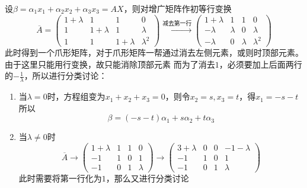 \begin{solution}
    设$\beta = \alpha_1 x_1 + \alpha_2 x_2 + \alpha_3 x_3 = AX$，则对增广矩阵作初等行变换
    \[
        \overline{A}=
        \left(\begin{array}{ccc|c}
                1+\lambda & 1         & 1         & 0         \\
                1         & 1+\lambda & 1         & \lambda   \\
                1         & 1         & 1+\lambda & \lambda^2
            \end{array}\right)
        \xrightarrow{\text{减去第一行}}
        \left(\begin{array}{ccc|c}
                1+\lambda & 1       & 1       & 0         \\
                -\lambda  & \lambda & 0       & \lambda   \\
                -\lambda  & 0       & \lambda & \lambda^2
            \end{array}\right)
    \]
    此时得到一个爪形矩阵，对于爪形矩阵一帮通过消去左侧元素，或则时顶部元素。由于这里只能用行变换，故只能消除顶部元素
    而为了消去$1$，必须要加上后面两行的$-\frac{1}{\lambda}$，所以进行分类讨论：
    \begin{enumerate}[(1)]
        \item 当$\lambda=0$时，方程组变为$x_1+x_2+x_3 = 0$，则令$x_2 = s,x_3=t$，得$x_1 = -s-t$所以
              \[ \beta = (-s-t)\alpha_1 + s\alpha_2 + t\alpha_3 \]
        \item 当$\lambda\neq 0 $时
              \[
                  \overline{A}
                  \longrightarrow
                  \left(\begin{array}{ccc|c}
                          1+\lambda & 1 & 1 & 0       \\
                          -1        & 1 & 0 & 1       \\
                          -1        & 0 & 1 & \lambda
                      \end{array}\right)
                  \longrightarrow
                  \left(\begin{array}{ccc|c}
                          3+\lambda & 0 & 0 & -1-\lambda \\
                          -1        & 1 & 0 & 1          \\
                          -1        & 0 & 1 & \lambda
                      \end{array}\right)
              \]
              此时需要将第一行化为$1$，那么又进行分类讨论

\end{enumerate}
\end{solution}
